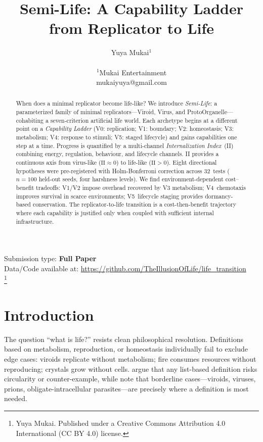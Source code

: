 \documentclass[letterpaper]{article}
\title{Semi-Life: A Capability Ladder from Replicator to Life}
\author{Yuya Mukai$^{1}$ \\
\mbox{} \\
$^1$Mukai Entertainment \\
mukaiyuya@gmail.com}
\newcommand\blfootnote[1]{%
  \begingroup
  \renewcommand\thefootnote{}\footnote{#1}%
  \addtocounter{footnote}{-1}%
  \endgroup
}
\begin{document}
\maketitle

\begin{abstract}
When does a minimal replicator become life-like?
We introduce \emph{Semi-Life}: a parameterized family of minimal
replicators---Viroid, Virus, and ProtoOrganelle---cohabiting a seven-criterion
artificial life world.
Each archetype begins at a different point on a \emph{Capability Ladder}
(V0: replication; V1: boundary; V2: homeostasis; V3: metabolism;
V4: response to stimuli; V5: staged lifecycle) and gains capabilities one step
at a time.
Progress is quantified by a multi-channel \emph{Internalization Index}~(II)
combining energy, regulation, behaviour, and lifecycle channels.
II provides a continuous axis from virus-like ($\mathrm{II}\!\approx\!0$) to
life-like ($\mathrm{II}\!>\!0$).
Eight directional hypotheses were pre-registered with Holm-Bonferroni
correction across 32~tests ($n\!=\!100$ held-out seeds, four harshness levels).
We find environment-dependent cost--benefit tradeoffs: V1/V2 impose overhead
recovered by V3 metabolism; V4~chemotaxis improves survival in scarce
environments; V5~lifecycle staging provides dormancy-based conservation.
The replicator-to-life transition is a cost-then-benefit trajectory where each
capability is justified only when coupled with sufficient internal infrastructure.
\end{abstract}

Submission type: \textbf{Full Paper}\\
Data/Code available at: \url{https://github.com/TheIllusionOfLife/life_transition}\\
\blfootnote{ Yuya Mukai. Published under a Creative
Commons Attribution 4.0 International (CC BY 4.0) license.}

\section{Introduction}
\label{sec:intro}

The question ``what is life?'' resists clean philosophical resolution.
Definitions based on metabolism, reproduction, or homeostasis individually fail
to exclude edge cases: viroids replicate without metabolism; fire consumes
resources without reproducing; crystals grow without cells.
\citet{cleland_2002_defining} argue that any list-based definition risks
circularity or counter-example, while \citet{benner_2010_defining} note that
borderline cases---viroids, viruses, prions, obligate-intracellular
parasites---are precisely where a definition is most needed.
\end{document}
